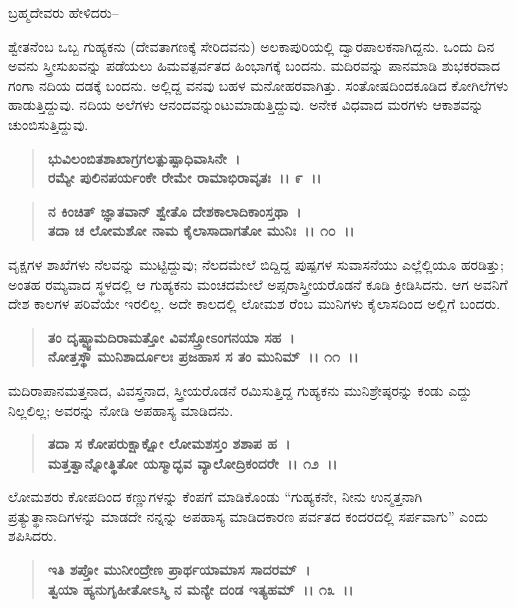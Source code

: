 \begin{flushleft}
 ಬ್ರಹ್ಮದೇವರು ಹೇಳಿದರು–
\end{flushleft}

ಶ್ವೇತನೆಂಬ ಒಬ್ಬ ಗುಹ್ಯಕನು (ದೇವತಾಗಣಕ್ಕೆ ಸೇರಿದವನು) ಅಲಕಾಪುರಿಯಲ್ಲಿ ದ್ವಾರಪಾಲಕನಾಗಿದ್ದನು. ಒಂದು ದಿನ ಅವನು ಸ್ತ್ರೀಸುಖವನ್ನು ಪಡೆಯಲು ಹಿಮವತ್ಪರ್ವತದ ಹಿಂಭಾಗಕ್ಕೆ ಬಂದನು. ಮದಿರವನ್ನು ಪಾನಮಾಡಿ ಶುಭಕರವಾದ ಗಂಗಾ ನದಿಯ ದಡಕ್ಕೆ ಬಂದನು. ಅಲ್ಲಿದ್ದ ವನವು ಬಹಳ ಮನೋಹರವಾಗಿತ್ತು. ಸಂತೋಷದಿಂದಕೂಡಿದ ಕೋಗಿಲೆಗಳು ಹಾಡುತ್ತಿದ್ದುವು. ನದಿಯ ಅಲೆಗಳು ಆನಂದವನ್ನುಂಟುಮಾಡುತ್ತಿದ್ದುವು. ಅನೇಕ ವಿಧವಾದ ಮರಗಳು ಆಕಾಶವನ್ನು ಚುಂಬಿಸುತ್ತಿದ್ದುವು.

\begin{verse}
\textbf{ಭುವಿಲಂಬಿತಶಾಖಾಗ್ರಗಲತ್ಪುಷ್ಪಾಧಿವಾಸಿನೇ~।}\\\textbf{ರಮ್ಯೇ ಪುಲಿನಪರ್ಯಂಕೇ ರೇಮೇ ರಾಮಾಭಿರಾವೃತಃ~।। ೯~।। }
\end{verse}

\begin{verse}
\textbf{ನ ಕಿಂಚಿತ್ ಜ್ಞಾತವಾನ್ ಶ್ವೇತೊ ದೇಶಕಾಲಾದಿಕಾಂಸ್ತಥಾ~।}\\\textbf{ತದಾ ಚ ಲೋಮಶೋ ನಾಮ ಕೈಲಾಸಾದಾಗತೋ ಮುನಿಃ~।। ೧೦~।।}
\end{verse}

ವೃಕ್ಷಗಳ ಶಾಖೆಗಳು ನೆಲವನ್ನು ಮುಟ್ಟಿದ್ದುವು; ನೆಲದಮೇಲೆ ಬಿದ್ದಿದ್ದ ಪುಷ್ಪಗಳ ಸುವಾಸನೆಯು ಎಲ್ಲೆಲ್ಲಿಯೂ ಹರಡಿತ್ತು; ಅಂತಹ ರಮ್ಯವಾದ ಸ್ಥಳದಲ್ಲಿ ಆ ಗುಹ್ಯಕನು ಮಂಚದಮೇಲೆ ಅಪ್ಸರಾಸ್ತ್ರೀಯರೊಡನೆ ಕೂಡಿ ಕ್ರೀಡಿಸಿದನು. ಆಗ ಅವನಿಗೆ ದೇಶ ಕಾಲಗಳ ಪರಿವೆಯೇ ಇರಲಿಲ್ಲ. ಅದೇ ಕಾಲದಲ್ಲಿ ಲೋಮಶ ರೆಂಬ ಮುನಿಗಳು ಕೈಲಾಸದಿಂದ ಅಲ್ಲಿಗೆ ಬಂದರು.

\begin{verse}
\textbf{ತಂ ದೃಷ್ಟ್ವಾಮದಿರಾಮತ್ತೋ ವಿವಸ್ತ್ರೋಽಂಗನಯಾ ಸಹ~।}\\\textbf{ನೋತ್ತಸ್ಥೌ ಮುನಿಶಾರ್ದೂಲಃ ಪ್ರಜಹಾಸ ಸ ತಂ ಮುನಿಮ್~।। ೧೧~।।}
\end{verse}

ಮದಿರಾಪಾನಮತ್ತನಾದ, ವಿವಸ್ತ್ರನಾದ, ಸ್ತ್ರೀಯರೊಡನೆ ರಮಿಸುತ್ತಿದ್ದ ಗುಹ್ಯಕನು ಮುನಿಶ್ರೇಷ್ಠರನ್ನು ಕಂಡು ಎದ್ದು ನಿಲ್ಲಲಿಲ್ಲ; ಅವರನ್ನು ನೋಡಿ ಅಪಹಾಸ್ಯ ಮಾಡಿದನು.

\begin{verse}
\textbf{ತದಾ ಸ ಕೋಪರುಕ್ಷಾಕ್ಷೋ ಲೋಮಶಸ್ತಂ ಶಶಾಪ ಹ~।}\\\textbf{ಮತ್ತತ್ವಾನ್ನೋತ್ಥಿತೋ ಯಸ್ಮಾದ್ಭವ ವ್ಯಾಲೋದ್ರಿಕಂದರೇ~।। ೧೨~।।}
\end{verse}

ಲೋಮಶರು ಕೋಪದಿಂದ ಕಣ್ಣುಗಳನ್ನು ಕೆಂಪಗೆ ಮಾಡಿಕೊಂಡು “ಗುಹ್ಯಕನೇ, ನೀನು ಉನ್ಮತ್ತನಾಗಿ ಪ್ರತ್ಯುತ್ಥಾನಾದಿಗಳನ್ನು ಮಾಡದೇ ನನ್ನನ್ನು ಅಪಹಾಸ್ಯ ಮಾಡಿದಕಾರಣ ಪರ್ವತದ ಕಂದರದಲ್ಲಿ ಸರ್ಪವಾಗು” ಎಂದು ಶಪಿಸಿದರು.

\begin{verse}
\textbf{ಇತಿ ಶಪ್ತೋ ಮುನೀಂದ್ರೇಣ ಪ್ರಾರ್ಥಯಾಮಾಸ ಸಾದರಮ್~।}\\\textbf{ತ್ವಯಾ ಹ್ಯನುಗೃಹೀತೋಽಸ್ಮಿ ನ ಮನ್ಯೇ ದಂಡ ಇತ್ಯಹಮ್~।। ೧೩~।।}
\end{verse}


